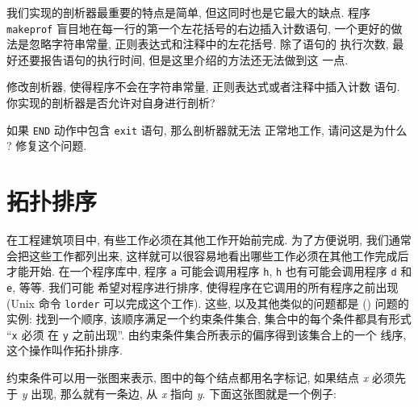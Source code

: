 我们实现的剖析器最重要的特点是简单, 但这同时也是它最大的缺点. 程序 
\texttt{makeprof} 盲目地在每一行的第一个左花括号的右边插入计数语句,
一个更好的做法是忽略字符串常量, 正则表达式和注释中的左花括号. 除了语句的
执行次数, 最好还要报告语句的执行时间, 但是这里介绍的方法还无法做到这
一点.

\begin{exercise}
    修改剖析器, 使得程序不会在字符串常量, 正则表达式或者注释中插入计数
    语句. 你实现的剖析器是否允许对自身进行剖析?
\end{exercise}

\begin{exercise}
    如果 \texttt{END} 动作中包含 \texttt{exit} 语句, 那么剖析器就无法
    正常地工作, 请问这是为什么 ? 修复这个问题.
\end{exercise}

\section{拓扑排序}
\label{sec:topological_sorting}

在工程建筑项目中, 有些工作必须在其他工作开始前完成. 为了方便说明, 我们通常
会把这些工作都列出来, 这样就可以很容易地看出哪些工作必须在其他工作完成后
才能开始. 在一个程序库中, 程序 \texttt{a} 可能会调用程序 \texttt{h},
\texttt{h} 也有可能会调用程序 \texttt{d}  和 \texttt{e}, 等等. 我们可能
希望对程序进行排序, 使得程序在它调用的所有程序之前出现 (Unix 命令
\texttt{lorder} 可以完成这个工作). 这些, 以及其他类似的问题都是
 () 问题的实例: 找到一个顺序,
该顺序满足一个约束条件集合, 集合中的每个条件都具有形式 ``\texttt{x} 必须
在 \texttt{y} 之前出现''. 由约束条件集合所表示的偏序得到该集合上的一个
线序, 这个操作叫作拓扑排序.

约束条件可以用一张图来表示, 图中的每个结点都用名字标记, 如果结点 \textit{x}
必须先于 \textit{y} 出现, 那么就有一条边, 从 \textit{x} 指向 \textit{y}.
下面这张图就是一个例子:
\begin{center}
\end{center}

